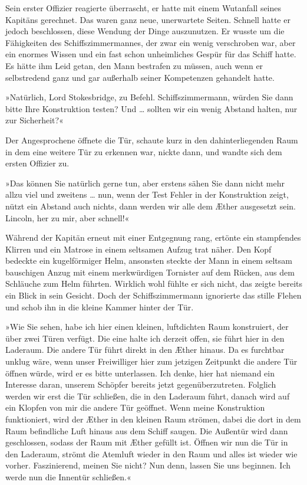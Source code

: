 Sein erster Offizier reagierte überrascht, er hatte mit einem
Wutanfall seines Kapitäns gerechnet. Das waren ganz neue,
unerwartete Seiten. Schnell hatte er jedoch beschlossen, diese
Wendung der Dinge auszunutzen. Er wusste um die Fähigkeiten des
Schiffszimmermannes, der zwar ein wenig verschroben war, aber ein
enormes Wissen und ein fast schon unheimliches Gespür für das
Schiff hatte. Es hätte ihm Leid getan, den Mann bestrafen zu
müssen, auch wenn er selbstredend ganz und gar außerhalb seiner
Kompetenzen gehandelt hatte.

»Natürlich, Lord Stokesbridge, zu Befehl. Schiffszimmermann, würden
Sie dann bitte Ihre Konstruktion testen? Und \ldots{} sollten wir ein
wenig Abstand halten, nur zur Sicherheit?«

Der Angesprochene öffnete die Tür, schaute kurz in den
dahinterliegenden Raum in dem eine weitere Tür zu erkennen war,
nickte dann, und wandte sich dem ersten Offizier zu.

»Das können Sie natürlich gerne tun, aber erstens sähen Sie dann
nicht mehr allzu viel und zweitens \ldots{} nun, wenn der Test Fehler in
der Konstruktion zeigt, nützt ein Abstand auch nichts, dann werden
wir alle dem Æther ausgesetzt sein. Lincoln, her zu mir, aber
schnell!«

Während der Kapitän erneut mit einer Entgegnung rang, ertönte ein
stampfendes Klirren und ein Matrose in einem seltsamen Aufzug trat
näher. Den Kopf bedeckte ein kugelförmiger Helm, ansonsten steckte
der Mann in einem seltsam bauschigen Anzug mit einem merkwürdigen
Tornister auf dem Rücken, aus dem Schläuche zum Helm führten.
Wirklich wohl fühlte er sich nicht, das zeigte bereits ein Blick in
sein Gesicht. Doch der Schiffszimmermann ignorierte das stille
Flehen und schob ihn in die kleine Kammer hinter der Tür.

»Wie Sie sehen, habe ich hier einen kleinen, luftdichten Raum
konstruiert, der über zwei Türen verfügt. Die eine halte ich
derzeit offen, sie führt hier in den Laderaum. Die andere Tür führt
direkt in den Æther hinaus. Da es furchtbar unklug wäre, wenn unser
Freiwilliger hier zum jetzigen Zeitpunkt die andere Tür öffnen
würde, wird er es bitte unterlassen. Ich denke, hier hat niemand
ein Interesse daran, unserem Schöpfer bereits jetzt
gegenüberzutreten. Folglich werden wir erst die Tür schließen, die
in den Laderaum führt, danach wird auf ein Klopfen von mir die
andere Tür geöffnet. Wenn meine Konstruktion funktioniert, wird der
Æther in den kleinen Raum strömen, dabei die dort in dem Raum
befindliche Luft hinaus aus dem Schiff saugen. Die Außentür wird
dann geschlossen, sodass der Raum mit Æther gefüllt ist. Öffnen wir
nun die Tür in den Laderaum, strömt die Atemluft wieder in den Raum
und alles ist wieder wie vorher. Faszinierend, meinen Sie nicht?
Nun denn, lassen Sie uns beginnen. Ich werde nun die Innentür
schließen.«

